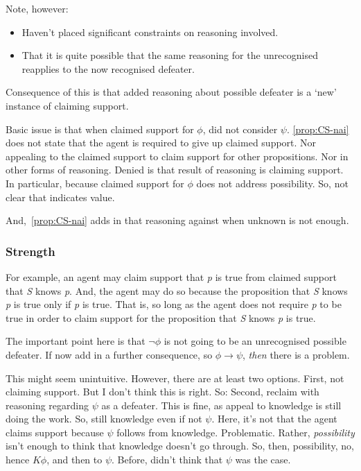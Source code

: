\begin{note}
  Note, however:

  \begin{itemize}
  \item Haven't placed significant constraints on reasoning involved.
  \item That it is quite possible that the same reasoning for the unrecognised reapplies to the now recognised defeater.
  \end{itemize}
\end{note}

\begin{note}
  Consequence of this is that added reasoning about possible defeater is a `new' instance of claiming support.
\end{note}

\begin{note}
  Basic issue is that when claimed support for \(\phi\), did not consider \(\psi\).
  \autoref{prop:CS-nai} does not state that the agent is required to give up claimed support.
  Nor appealing to the claimed support to claim support for other propositions.
  Nor in other forms of reasoning.
  Denied is that result of reasoning is claiming support.
  In particular, because claimed support for \(\phi\) does not address possibility.
  So, not clear that indicates value.

  And,~\autoref{prop:CS-nai} adds in that reasoning against when unknown is not enough.
\end{note}

\subsubsection{Strength}

\begin{note}
  For example, an agent may claim support that \emph{p} is true from claimed support that \emph{S} knows \emph{p}.
  And, the agent may do so because the proposition that \emph{S} knows \emph{p} is true only if \emph{p} is true.
  That is, so long as the agent does not require \emph{p} to be true in order to claim support for the proposition that \emph{S} knows \emph{p} is true.
  {
    \color{red}
    The important point here is that \(\lnot\phi\) is not going to be an unrecognised possible defeater.
    If now add in a further consequence, so \(\phi \rightarrow \psi\), \emph{then} there is a problem.

    This might seem unintuitive.
    However, there are at least two options.
    First, not claiming support.
    But I don't think this is right.
    So:
    Second, reclaim with reasoning regarding \(\psi\) as a defeater.
    This is fine, as appeal to knowledge is still doing the work.
    So, still knowledge even if not \(\psi\).
    Here, it's not that the agent claims support because \(\psi\) follows from knowledge.
    Problematic.
    Rather, \emph{possibility} isn't enough to think that knowledge doesn't go through.
    So, then, possibility, no, hence \(K\phi\), and then to \(\psi\).
    Before, didn't think that \(\psi\) was the case.
  }
\end{note}

